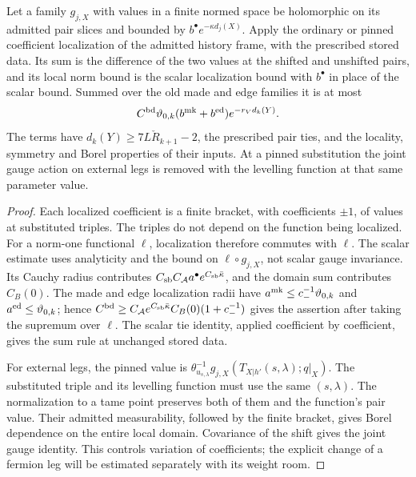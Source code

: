 \documentclass[11pt,letterpaper,reqno]{amsart}
\makeatletter
\theoremstyle{definition}
\newcommand{\ms@minorstart}{%
  \pushQED{\qed}\renewcommand{\qedsymbol}{$\blacksquare$}}
\newenvironment{lemma}[1][]{\ms@minorstart\ms@lemma[#1]}
  {\popQED\endms@lemma}
\theoremstyle{remark}
\makeatother
\begin{document}
\begin{lemma}[Variation of an earlier boundary coefficient]
\label{C-399-48}
Let a family $g_{j,X}$ with values in a finite normed
space be holomorphic on its admitted pair slices and
bounded by $b^\bullet e^{-\kappa d_j(X)}$. Apply the
ordinary or pinned coefficient localization of the
admitted history frame, with the prescribed stored data.
Its sum is the difference of the two values at the
shifted and unshifted pairs, and its local norm bound is
the scalar localization bound with $b^\bullet$ in place
of the scalar bound. Summed over the old made and edge
families it is at most
\[
 C^{\rm bd}\vartheta_{0,k}
       (b^{\rm mk}+b^{\rm ed})e^{-r_Vd_k(Y)}.
\]
The terms have $d_k(Y)\ge7L\check R_{k+1}-2$,
the prescribed pair ties, and the locality, symmetry and
Borel properties of their inputs. At a pinned substitution
the joint gauge action on external legs is removed with
the levelling function at that same parameter value.
\end{lemma}
\begin{proof}
Each localized coefficient is a finite bracket, with
coefficients $\pm1$, of values at substituted triples.
The triples do not depend on the function being
localized. For a norm-one functional $\ell$,
localization therefore commutes with $\ell$.
The scalar estimate uses analyticity and the bound on
$\ell\circ g_{j,X}$, not scalar gauge invariance. Its
Cauchy radius contributes
$C_{\rm sb}C_{\mathcal A}a^\bullet
e^{C_{\rm sb}\bar\kappa}$, and the domain sum contributes
$C_B(0)$. The made and edge localization radii have
$a^{\rm mk}\le c_-^{-1}\vartheta_{0,k}$ and
$a^{\rm ed}\le\vartheta_{0,k}$; hence
$C^{\rm bd}\ge
C_{\mathcal A}e^{C_{\rm sb}\bar\kappa}C_B(0)(1+c_-^{-1})$
gives the assertion after taking the supremum over $\ell$.
The scalar tie identity, applied coefficient by
coefficient, gives the sum rule at unchanged stored data.

For external legs, the pinned value is
$\theta_{u_{s,\lambda}}^{-1}
g_{j,X}(T_{X|h'}(s,\lambda);q|_X)$.
The substituted triple and its levelling function must
use the same $(s,\lambda)$. The normalization to a tame
point preserves both of them and the function's pair
value. Their admitted measurability, followed by the
finite bracket, gives Borel dependence on the entire
local domain. Covariance of the shift gives the joint
gauge identity. This controls variation of coefficients;
the explicit change of a fermion leg will be estimated
separately with its weight room.
\end{proof}
\end{document}
